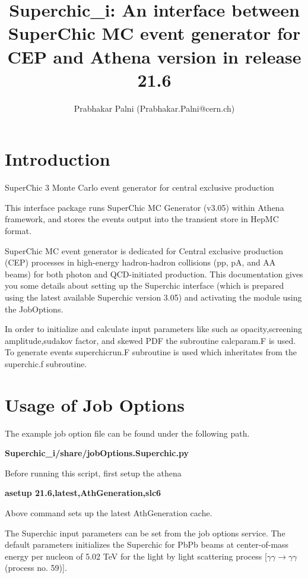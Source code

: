 \documentclass[11pt]{article}
\begin{document}
\title{Superchic\_i: An interface between SuperChic  MC event generator for CEP and Athena
version in release 21.6}
\author{ Prabhakar  Palni (Prabhakar.Palni@cern.ch)}

\maketitle


\section{Introduction}


 SuperChic 3 Monte Carlo event generator for central exclusive production

This interface package runs SuperChic MC Generator (v3.05) within Athena framework, and stores the events output into the transient store in HepMC format.

SuperChic MC event generator is dedicated for Central exclusive production (CEP) processes in high-energy hadron-hadron collisions (pp, pA, and AA beams) for both photon and QCD-initiated production. This documentation gives you some details about setting up the Superchic interface (which is prepared using the latest available Superchic version 3.05) and activating the module using the JobOptions. 

In order to initialize and calculate input parameters like such as opacity,screening amplitude,sudakov factor, and skewed PDF the subroutine calcparam.F is used. To generate events superchicrun.F subroutine is used which inheritates from the superchic.f subroutine.


\section{Usage of Job Options}


The example job option file can be found under the following path.
 
 {\bf Superchic\_i/share/jobOptions.Superchic.py }
 
Before running this script, first setup the athena 
 
 {\bf asetup 21.6,latest,AthGeneration,slc6 }
 
 Above command sets up the latest AthGeneration cache.
 
The Superchic input parameters can be set from the job options service. The
 default parameters initializes the  Superchic for PbPb beams at center-of-mass energy per nucleon of 5.02 TeV for the light by light scattering process [$\gamma \gamma  \rightarrow \gamma \gamma$ (process no. 59)].
 
\end{document}
